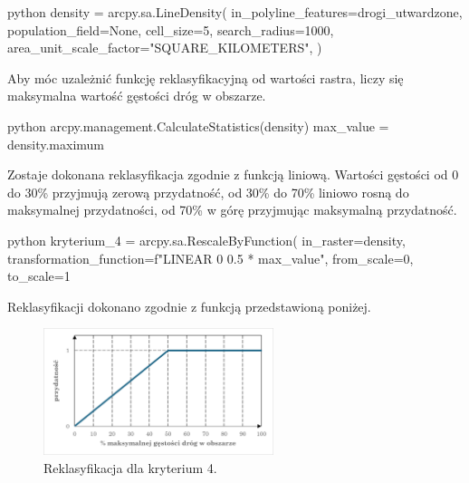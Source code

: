 \documentclass{article}
\begin{document}
\begin{mintedbox}{python}
density = arcpy.sa.LineDensity(
    in_polyline_features=drogi_utwardzone,
    population_field=None,
    cell_size=5,
    search_radius=1000,
    area_unit_scale_factor="SQUARE_KILOMETERS",
)
\end{mintedbox}
\vspace{10pt}

Aby móc uzależnić funkcję reklasyfikacyjną od wartości rastra, liczy się maksymalna wartość gęstości dróg w obszarze.
\vspace{5pt}

\begin{mintedbox}{python}
arcpy.management.CalculateStatistics(density)
max_value = density.maximum
\end{mintedbox}
\vspace{10pt}

Zostaje dokonana reklasyfikacja zgodnie z funkcją liniową. Wartości gęstości od 0 do 30\% przyjmują zerową przydatność, od 30\% do 70\% liniowo rosną do maksymalnej przydatności, od 70\% w górę przyjmując maksymalną przydatność.
\vspace{5pt}

\begin{mintedbox}{python}
kryterium_4 = arcpy.sa.RescaleByFunction(
    in_raster=density,
    transformation_function=f"LINEAR 0 {0.5 * max_value}",
    from_scale=0,
    to_scale=1   
\end{mintedbox}
\vspace{10pt}

Reklasyfikacji dokonano zgodnie z funkcją przedstawioną poniżej.
\vspace{5pt}

\begin{figure}[H]
    \centering
    \includegraphics[width=0.6\textwidth]{img/kryterium4-wykres-glowny.png}
    \caption{Reklasyfikacja dla kryterium 4.}
\end{figure}
\end{document}
